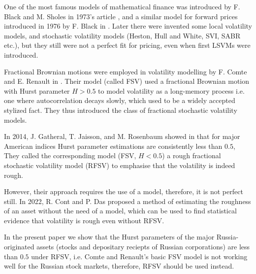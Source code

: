One of the most famous models of mathematical finance was introduced by F. Black and
M. Sholes in 1973's article \cite{BlackSholes1973}, and a similar model for forward prices 
introduced in 1976 by F. Black in \cite{Black1976}. 
Later there were invented some local volatility models, and stochastic volatility models 
(Heston, Hull and White, SVI, SABR etc.), but they still were not a perfect fit for pricing, 
even when first LSVMs were introduced.

Fractional Brownian motions were employed in volatility modelling by F. Comte and 
E. Renault in \cite{ComteRenault1998}. Their model (called FSV) used a fractional Brownian 
motion with Hurst parameter $H > 0.5$ to model volatility as a long-memory process i.e. 
one where autocorrelation decays slowly, which used to be a widely accepted stylized fact. They 
thus introduced the class of fractional stochastic volatility models.

In 2014, J. Gatheral, T. Jaisson, and M. Rosenbaum showed in \cite{GatheralRosenbaum2014} 
that for major American indices Hurst parameter estimations are consistently less than $0.5$, 
They called the corresponding model (FSV, $H < 0.5$) a rough fractional stochastic volatility model 
(RFSV) to emphasise that the volatility is indeed rough.

However, their approach requires the use of a model, therefore, it is not perfect still.
In 2022, R. Cont and P. Das \cite{Cont2022} proposed a method of estimating the roughness of 
an asset without the need of a model, which can be used to find statistical evidence that
volatility is rough even without RFSV.

In the present paper we show that the Hurst parameters of the major Russia-originated 
assets (stocks and depositary reciepts of Russian corporations) are less than $0.5$ under RFSV, 
i.e. Comte and Renault's basic FSV model is not working well for the Russian stock markets, 
therefore, RFSV should be used instead.